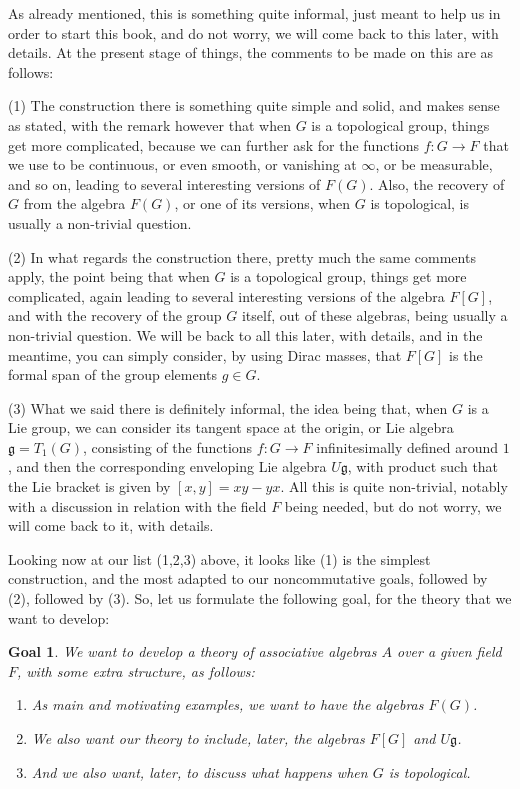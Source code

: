 \documentclass[12pt]{amsbook}
\newtheorem{goal}[theorem]{Goal}
\begin{document}
As already mentioned, this is something quite informal, just meant to help us in order to start this book, and do not worry, we will come back to this later, with details. At the present stage of things, the comments to be made on this are as follows:

\bigskip

(1) The construction there is something quite simple and solid, and makes sense as stated, with the remark however that when $G$ is a topological group, things get more complicated, because we can further ask for the functions $f:G\to F$ that we use to be continuous, or even smooth, or vanishing at $\infty$, or be measurable, and so on, leading to several interesting versions of $F(G)$. Also, the recovery of $G$ from the algebra $F(G)$, or one of its versions, when $G$ is topological, is usually a non-trivial question.

\bigskip

(2) In what regards the construction there, pretty much the same comments apply, the point being that when $G$ is a topological group, things get more complicated, again leading to several interesting versions of the algebra $F[G]$, and with the recovery of the group $G$ itself, out of these algebras, being usually a non-trivial question. We will be back to all this later, with details, and in the meantime, you can simply consider, by using Dirac masses, that $F[G]$ is the formal span of the group elements $g\in G$.

\bigskip

(3) What we said there is definitely informal, the idea being that, when $G$ is a Lie group, we can consider its tangent space at the origin, or Lie algebra $\mathfrak g=T_1(G)$, consisting of the functions $f:G\to F$ infinitesimally defined around $1$, and then the corresponding enveloping Lie algebra $U\mathfrak g$, with product such that the Lie bracket is given by $[x,y]=xy-yx$. All this is quite non-trivial, notably with a discussion in relation with the field $F$ being needed, but do not worry, we will come back to it, with details.

\bigskip

Looking now at our list (1,2,3) above, it looks like (1) is the simplest construction, and the most adapted to our noncommutative goals, followed by (2), followed by (3). So, let us formulate the following goal, for the theory that we want to develop:

\begin{goal}
We want to develop a theory of associative algebras $A$ over a given field $F$, with some extra structure, as follows:
\begin{enumerate}
\item As main and motivating examples, we want to have the algebras $F(G)$.

\item We also want our theory to include, later, the algebras $F[G]$ and $U\mathfrak g$.

\item And we also want, later, to discuss what happens when $G$ is topological.
\end{enumerate}
\end{goal}
\end{document}

